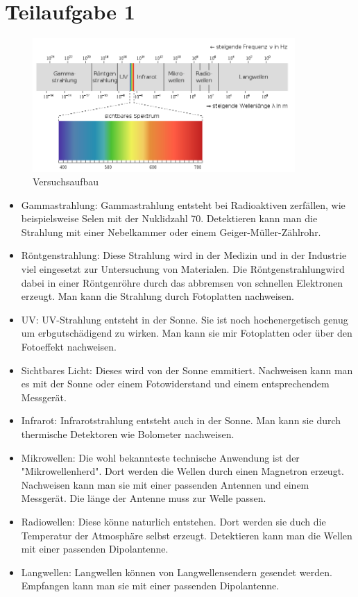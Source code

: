 

\section{Teilaufgabe 1}


\begin{figure}[h]
    \begin{center}
        \includegraphics[width=10cm]{Bilder/Emspekt.PNG}
    \end{center}
    \caption{Versuchsaufbau}
   \end{figure}

\begin{itemize}
    \item Gammastrahlung: Gammastrahlung entsteht bei Radioaktiven zerfällen, wie beispielsweise Selen mit der Nuklidzahl 70. Detektieren kann man die Strahlung mit einer Nebelkammer oder einem Geiger-Müller-Zählrohr.
    \item Röntgenstrahlung: Diese Strahlung wird in der Medizin und in der Industrie viel eingesetzt zur Untersuchung von Materialen. Die Röntgenstrahlungwird dabei in einer Röntgenröhre durch das abbremsen von schnellen Elektronen erzeugt. Man kann die Strahlung durch Fotoplatten nachweisen.
    \item UV: UV-Strahlung entsteht in der Sonne. Sie ist noch hochenergetisch genug um erbgutschädigend zu wirken. Man kann sie mir Fotoplatten oder über den Fotoeffekt nachweisen.
    \item Sichtbares Licht: Dieses wird von der Sonne emmitiert. Nachweisen kann man es mit der Sonne oder einem Fotowiderstand und einem entsprechendem Messgerät.
    \item Infrarot: Infrarotstrahlung entsteht auch in der Sonne. Man kann sie durch thermische Detektoren wie Bolometer nachweisen.
    \item Mikrowellen: Die wohl bekannteste technische Anwendung ist der "Mikrowellenherd". Dort werden die Wellen durch einen Magnetron erzeugt. Nachweisen kann man sie mit einer passenden Antennen und einem Messgerät. Die länge der Antenne muss zur Welle passen.
    \item Radiowellen: Diese könne naturlich entstehen. Dort werden sie duch die Temperatur der Atmosphäre selbst erzeugt. Detektieren kann man die Wellen mit einer passenden Dipolantenne.
    \item Langwellen: Langwellen können von Langwellensendern gesendet werden. Empfangen kann man sie mit einer passenden Dipolantenne.
\end{itemize}